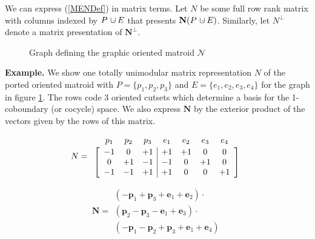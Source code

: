\documentclass[12pt]{article}
\theoremstyle{definition}
\newcommand{\dunion}
{\mbox{\hbox{\hskip6pt$\cdot$\hskip-5.50pt$\cup$\hskip2pt}}}
\newcommand{\ext}[1]{\ensuremath{\mathbf{#1}}}
\begin{document}
We can express  (\ref{MENDef}) in matrix terms.
Let $N$ be some full row rank matrix with columns indexed
by $P\dunion E$ that presents $\ext{N}(P\dunion E)$.
Similarly, let $N^{\perp}$ denote a matrix presentation
of $\ext{N}^{\perp}$.

\begin{figure}
\begin{center}\end{center}
\caption{Graph defining the graphic oriented matroid $\mathcal{N}$}
\label{K4figure}
\end{figure}

\textbf{Example.} 
We show one totally unimodular matrix
representation $N$ of the 
ported oriented matroid with $P=\{p_1,p_2,p_3\}$
and $E=\{e_1,e_2,e_3,e_4\}$ for the graph in figure \ref{K4figure}.
The rows code 3 oriented cutsets 
which determine 
a basis for the 1-coboundary (or cocycle) space.  We also
express $\ext{N}$ by the exterior 
product 
of the vectors given by the rows of this matrix.


\[
N=\begin{array}{c}
\begin{array}{ccccccc}
p_1 & p_2 & p_3 & e_1 & e_2 & e_3 & e_4 \\[-1em]
\hphantom{+1} & \hphantom{+1} &\hphantom{+1} &\hphantom{+1} &\hphantom{+1} &\hphantom{+1} &\hphantom{+1} 
\end{array} \\ 
\left[\begin{array}{ccc|cccc}
 -1 &  0  &  +1 & +1  &  +1 &  0  & 0   \\ 
  0 & +1  &  -1 & -1  &   0 & +1  & 0   \\ 
 -1 & -1  &  +1 & +1  &   0 &  0  &+1  
\end{array}\right]
  \end{array}
\]

\[
\ext{N}=
\begin{array}{c}
(-\ext{p}_1+\ext{p}_3+\ext{e}_1+\ext{e}_2)\cdot\\
(\ext{p}_2-\ext{p}_3-\ext{e}_1+\ext{e}_3)\cdot\\
(-\ext{p}_1-\ext{p}_2+\ext{p}_3+\ext{e}_1+\ext{e}_4)
\end{array}
\]
\end{document}
